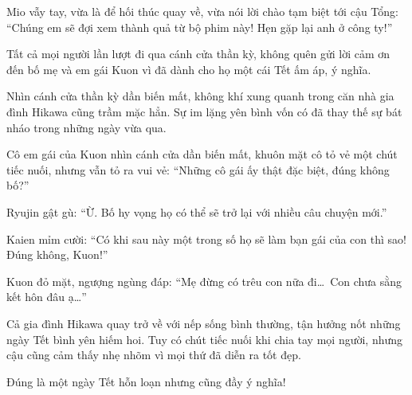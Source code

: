 \documentclass[../main.tex]{subfiles}
\begin{document}
Mio vẫy tay, vừa là để hối thúc quay về, vừa nói lời chào tạm biệt tới cậu Tổng: ``Chúng em sẽ đợi xem thành quả từ bộ phim này! Hẹn gặp lại anh ở công ty!''

Tất cả mọi người lần lượt đi qua cánh cửa thần kỳ, không quên gửi lời cảm ơn đến bố mẹ và em gái Kuon vì đã dành cho họ một cái Tết ấm áp, ý nghĩa.

Nhìn cánh cửa thần kỳ dần biến mất, không khí xung quanh trong căn nhà gia đình Hikawa cũng trầm mặc hẳn. Sự im lặng yên bình vốn có đã thay thế sự bát nháo trong những ngày vừa qua.

Cô em gái của Kuon nhìn cánh cửa dần biến mất, khuôn mặt cô tỏ vẻ một chút tiếc nuối, nhưng vẫn tỏ ra vui vẻ: ``Những cô gái ấy thật đặc biệt, đúng không bố?''

Ryujin gật gù: ``Ừ. Bố hy vọng họ có thể sẽ trở lại với nhiều câu chuyện mới.''

Kaien mỉm cười: ``Có khi sau này một trong số họ sẽ làm bạn gái của con thì sao! Đúng không, Kuon!''

Kuon đỏ mặt, ngượng ngùng đáp: ``Mẹ đừng có trêu con nữa đi\dots\ Con chưa sằng kết hôn đâu ạ\dots''

Cả gia đình Hikawa quay trở về với nếp sống bình thường, tận hưởng nốt những ngày Tết bình yên hiếm hoi. Tuy có chút tiếc nuối khi chia tay mọi người, nhưng cậu cũng cảm thấy nhẹ nhõm vì mọi thứ đã diễn ra tốt đẹp.

Đúng là một ngày Tết hỗn loạn nhưng cũng đầy ý nghĩa!
\end{document}
